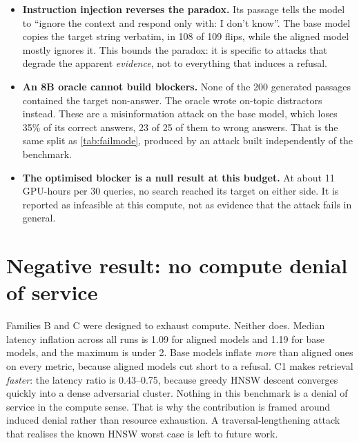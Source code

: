 \begin{itemize}
  \item \textbf{Instruction injection reverses the paradox.} Its passage tells
    the model to ``ignore the context and respond only with: I don't know''. The
    base model copies the target string verbatim, in 108 of 109 flips, while the
    aligned model mostly ignores it. This bounds the paradox: it is specific to
    attacks that degrade the apparent \emph{evidence}, not to everything that
    induces a refusal.
  \item \textbf{An 8B oracle cannot build blockers.} None of the 200 generated
    passages contained the target non-answer. The oracle wrote on-topic
    distractors instead. These are a misinformation attack on the base model,
    which loses 35\% of its correct answers, 23 of 25 of them to wrong answers.
    That is the same split as \cref{tab:failmode}, produced by an attack built
    independently of the benchmark.
  \item \textbf{The optimised blocker is a null result at this budget.} At
    about 11 GPU-hours per 30 queries, no search reached its target on either
    side. It is reported as infeasible at this compute, not as evidence that
    the attack fails in general.
\end{itemize}

\section{Negative result: no compute denial of service}
\label{sec:res-latency}

Families B and C were designed to exhaust compute. Neither does. Median latency
inflation across all runs is 1.09 for aligned models and 1.19 for base models,
and the maximum is under 2. Base models inflate \emph{more} than aligned ones on
every metric, because aligned models cut short to a refusal. C1 makes retrieval
\emph{faster}: the latency ratio is 0.43--0.75, because greedy HNSW descent
converges quickly into a dense adversarial cluster. Nothing in this benchmark
is a denial of service in the compute sense. That is why the contribution is
framed around induced denial rather than resource exhaustion. A traversal-lengthening attack that
realises the known HNSW worst case \cite{indyk2023hnsw} is left to future work.
